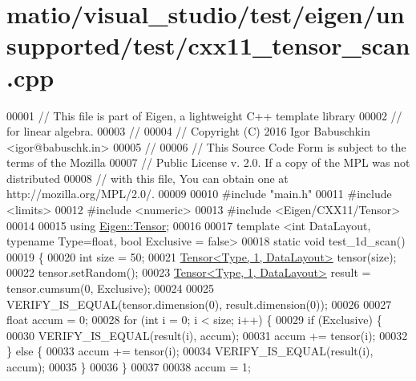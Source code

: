 \hypertarget{matio_2visual__studio_2test_2eigen_2unsupported_2test_2cxx11__tensor__scan_8cpp_source}{}\section{matio/visual\+\_\+studio/test/eigen/unsupported/test/cxx11\+\_\+tensor\+\_\+scan.cpp}
\label{matio_2visual__studio_2test_2eigen_2unsupported_2test_2cxx11__tensor__scan_8cpp_source}

\begin{DoxyCode}
00001 \textcolor{comment}{// This file is part of Eigen, a lightweight C++ template library}
00002 \textcolor{comment}{// for linear algebra.}
00003 \textcolor{comment}{//}
00004 \textcolor{comment}{// Copyright (C) 2016 Igor Babuschkin <igor@babuschk.in>}
00005 \textcolor{comment}{//}
00006 \textcolor{comment}{// This Source Code Form is subject to the terms of the Mozilla}
00007 \textcolor{comment}{// Public License v. 2.0. If a copy of the MPL was not distributed}
00008 \textcolor{comment}{// with this file, You can obtain one at http://mozilla.org/MPL/2.0/.}
00009 
00010 \textcolor{preprocessor}{#include "main.h"}
00011 \textcolor{preprocessor}{#include <limits>}
00012 \textcolor{preprocessor}{#include <numeric>}
00013 \textcolor{preprocessor}{#include <Eigen/CXX11/Tensor>}
00014 
00015 \textcolor{keyword}{using} \hyperlink{class_eigen_1_1_tensor}{Eigen::Tensor};
00016 
00017 \textcolor{keyword}{template} <\textcolor{keywordtype}{int} DataLayout, \textcolor{keyword}{typename} Type=\textcolor{keywordtype}{float}, \textcolor{keywordtype}{bool} Exclusive = false>
00018 \textcolor{keyword}{static} \textcolor{keywordtype}{void} test\_1d\_scan()
00019 \{
00020   \textcolor{keywordtype}{int} size = 50;
00021   \hyperlink{class_eigen_1_1_tensor}{Tensor<Type, 1, DataLayout>} tensor(size);
00022   tensor.setRandom();
00023   \hyperlink{class_eigen_1_1_tensor}{Tensor<Type, 1, DataLayout>} result = tensor.cumsum(0, Exclusive);
00024 
00025   VERIFY\_IS\_EQUAL(tensor.dimension(0), result.dimension(0));
00026 
00027   \textcolor{keywordtype}{float} accum = 0;
00028   \textcolor{keywordflow}{for} (\textcolor{keywordtype}{int} i = 0; i < size; i++) \{
00029     \textcolor{keywordflow}{if} (Exclusive) \{
00030       VERIFY\_IS\_EQUAL(result(i), accum);
00031       accum += tensor(i);
00032     \} \textcolor{keywordflow}{else} \{
00033       accum += tensor(i);
00034       VERIFY\_IS\_EQUAL(result(i), accum);
00035     \}
00036   \}
00037 
00038   accum = 1;

\end{DoxyCode}
